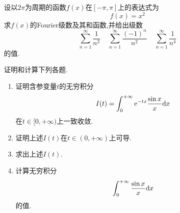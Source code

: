 \documentclass{ctexart}
\begin{document}
\begin{problem}[7.(20\songti{分})]
    设以$2\pi$为周期的函数$f(x)$在$[-\pi,\pi]$上的表达式为
    \[f(x)=x^2\]
    求$f(x)$的Fourier级数及其和函数,并给出级数
    \[\sum_{n=1}^{\infty}\dfrac{1}{n^2}
    \ \ \ \ \ \sum_{n=1}^{\infty}\dfrac{(-1)^n}{n^2}
    \ \ \ \ \ \sum_{n=1}^{\infty}\dfrac{1}{n^4}\]
    的值.

\end{problem}

\begin{problem}[8.(10\songti{分})]
    证明和计算下列各题.
    \begin{enumerate}[label=\tbf{(\arabic*)},topsep=0pt,parsep=0pt,itemsep=0pt,partopsep=0pt]
        \item 证明含参变量$t$的无穷积分
            \[I(t)=\int_0^{+\infty}\mathrm{e}^{-tx}\dfrac{\sin x}{x}\mathrm{d} x\]
            在$t\in[0,+\infty)$上一致收敛.
        \item 证明上述$I(t)$在$t\in(0,+\infty)$上可导.
        \item 求出上述$I(t)$.
        \item 计算无穷积分
            \[\int_0^{+\infty}\dfrac{\sin x}{x}\mathrm{d} x\]
            的值.
    \end{enumerate}

\end{problem}
\end{document}
